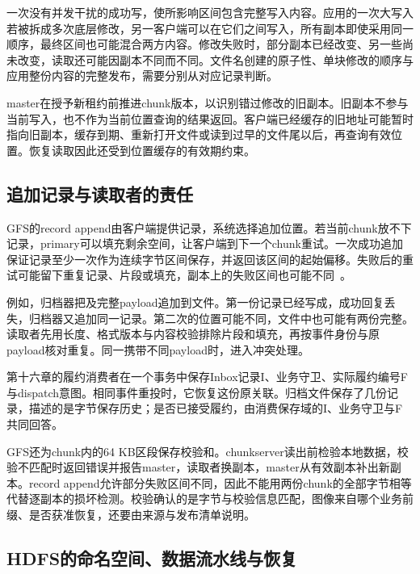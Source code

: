 一次没有并发干扰的成功写，使所影响区间包含完整写入内容。应用的一次大写入若被拆成多次底层修改，另一客户端可以在它们之间写入，所有副本即使采用同一顺序，最终区间也可能混合两方内容。修改失败时，部分副本已经改变、另一些尚未改变，读取还可能因副本不同而不同。文件名创建的原子性、单块修改的顺序与应用整份内容的完整发布，需要分别从对应记录判断。


master在授予新租约前推进chunk版本，以识别错过修改的旧副本。旧副本不参与当前写入，也不作为当前位置查询的结果返回。客户端已经缓存的旧地址可能暂时指向旧副本，缓存到期、重新打开文件或读到过早的文件尾以后，再查询有效位置。恢复读取因此还受到位置缓存的有效期约束。

\subsection{追加记录与读取者的责任}

GFS的record append由客户端提供记录，系统选择追加位置。若当前chunk放不下记录，primary可以填充剩余空间，让客户端到下一个chunk重试。一次成功追加保证记录至少一次作为连续字节区间保存，并返回该区间的起始偏移。失败后的重试可能留下重复记录、片段或填充，副本上的失败区间也可能不同~\cite{gfs2003}。

例如，归档器把及完整payload追加到文件。第一份记录已经写成，成功回复丢失，归档器又追加同一记录。第二次的位置可能不同，文件中也可能有两份完整。读取者先用长度、格式版本与内容校验排除片段和填充，再按事件身份与原payload核对重复。同一携带不同payload时，进入冲突处理。


第十六章的履约消费者在一个事务中保存Inbox记录I、业务守卫、实际履约编号F与dispatch意图。相同事件重投时，它恢复这份原关联。归档文件保存了几份记录，描述的是字节保存历史；是否已接受履约，由消费保存域的I、业务守卫与F共同回答。

GFS还为chunk内的64 KB区段保存校验和。chunkserver读出前检验本地数据，校验不匹配时返回错误并报告master，读取者换副本，master从有效副本补出新副本。record append允许部分失败区间不同，因此不能用两份chunk的全部字节相等代替逐副本的损坏检测。校验确认的是字节与校验信息匹配，图像来自哪个业务前缀、是否获准恢复，还要由来源与发布清单说明。

\subsection{HDFS的命名空间、数据流水线与恢复}

